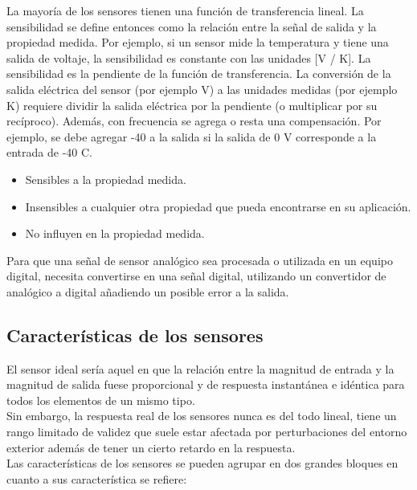La mayoría de los sensores tienen una función de transferencia lineal. La sensibilidad se define entonces como la relación entre la señal de salida y la propiedad medida. 
Por ejemplo, si un sensor mide la temperatura y tiene una salida de voltaje, la sensibilidad es constante con las unidades [V / K]. La sensibilidad es la pendiente de la función 
de transferencia. La conversión de la salida eléctrica del sensor (por ejemplo V) a las unidades medidas (por ejemplo K) requiere dividir la salida eléctrica por la pendiente 
(o multiplicar por su recíproco). Además, con frecuencia se agrega o resta una compensación. Por ejemplo, se debe agregar -40 a la salida si la salida de 0 V corresponde a la 
entrada de -40 \textdegree C.\\

\begin{itemize}
 \item Sensibles a la propiedad medida.
 \item Insensibles a cualquier otra propiedad que pueda encontrarse en su aplicación.
 \item No influyen en la propiedad medida.
\end{itemize}

Para que una señal de sensor analógico sea procesada o utilizada en un equipo digital, necesita convertirse en una señal digital, utilizando un convertidor de analógico a 
digital añadiendo un posible error a la salida.\\



\subsection{Características de los sensores}

El sensor  ideal  sería  aquel  en  que  la  relación  entre la magnitud de entrada y la 
magnitud de salida fuese proporcional y de respuesta instantánea e idéntica para todos los elementos de un mismo tipo. \\

Sin  embargo, la respuesta real de los sensores  nunca  es del todo lineal, tiene un rango  limitado  de  validez que  suele  estar afectada por perturbaciones del entorno exterior además de tener un cierto retardo en la respuesta. \\

Las características de los sensores se pueden agrupar en dos grandes bloques en cuanto a sus característica se refiere:\\

